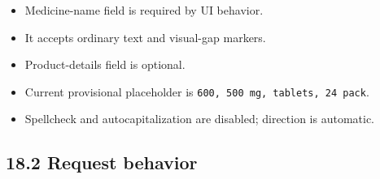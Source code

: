 \begin{itemize}
\tightlist
\item
  Medicine-name field is required by UI behavior.
\item
  It accepts ordinary text and visual-gap markers.
\item
  Product-details field is optional.
\item
  Current provisional placeholder is \texttt{600,\ 500\ mg,\ tablets,\ 24\ pack}.
\item
  Spellcheck and autocapitalization are disabled; direction is automatic.
\end{itemize}

\subsection{18.2 Request behavior}\label{182-request-behavior}

